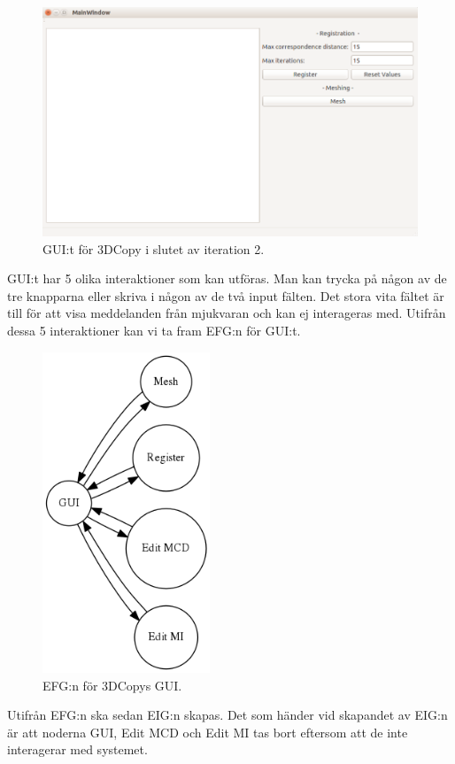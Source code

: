\begin{figure}[H]
	\centering
	\includegraphics[width=130mm]{figures/3DCopyGUI.PNG}
	\caption{GUI:t för 3DCopy i slutet av iteration 2.}
	\label{fig:3dcopy_gui}
\end{figure}

GUI:t har 5 olika interaktioner som kan utföras. Man kan trycka på någon av de tre knapparna eller skriva i någon av de två input fälten. Det stora vita fältet är till för att visa meddelanden från mjukvaran och kan ej interageras med. Utifrån dessa 5 interaktioner kan vi ta fram EFG:n för GUI:t.

\begin{figure}[H]
	\centering
	\includegraphics[width=50mm]{figures/3DCopyGUIEFG.png}
	\caption{EFG:n för 3DCopys GUI.}
	\label{fig:3dcopy_guiefg}
\end{figure}

Utifrån EFG:n ska sedan EIG:n skapas. Det som händer vid skapandet av EIG:n är att noderna GUI, Edit MCD och Edit MI tas bort eftersom att de inte interagerar med systemet.

